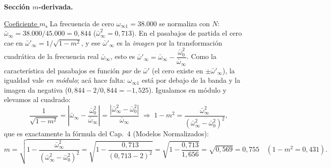 \documentclass[class=article, crop=false, oneside]{standalone}
\begin{document}
\begin{figure}[H]
    \centering
    
\end{figure}

\noindent\textbf{Sección $m$-derivada.}

\noindent\underline{Coeficiente $m$.} La frecuencia de cero $\omega_{\infty 1} = 38.000$
se normaliza con $N$: $\bar\omega_\infty = 38.000/45.000 = 0{,}844$
($\bar\omega_\infty^2 = 0{,}713$). En el pasabajos de partida el cero cae en
$\bar\omega'_\infty = 1/\sqrt{1-m^2}$, y ese $\bar\omega'_\infty$ es la \emph{imagen}
por la transformación cuadrática de la frecuencia real $\bar\omega_\infty$, esto es
$\bar\omega'_\infty = \bar\omega_\infty - \dfrac{\bar\omega_0^2}{\bar\omega_\infty}$.
Como la característica del pasabajos es función \emph{par} de $\bar\omega'$ (el cero
existe en $\pm\bar\omega'_\infty$), la igualdad vale \emph{en módulo}; acá hace falta:
$\omega_{\infty 1}$ está por debajo de la banda y la imagen da negativa
($0{,}844 - 2/0{,}844 = -1{,}525$). Igualamos en módulo y elevamos al cuadrado:
\[
    \frac{1}{\sqrt{1-m^2}} = \left|\bar\omega_\infty - \frac{\bar\omega_0^2}{\bar\omega_\infty}\right|
    = \frac{\left|\bar\omega_\infty^2-\bar\omega_0^2\right|}{\bar\omega_\infty}
    \;\Rightarrow\;
    1-m^2 = \frac{\bar\omega_\infty^2}{\left(\bar\omega_\infty^2-\bar\omega_0^2\right)^2},
\]
que es exactamente la fórmula del Cap.~4 (Modelos Normalizados):
\[
    m = \sqrt{1-\frac{\bar\omega_\infty^2}{\left(\bar\omega_\infty^2-\bar\omega_0^2\right)^2}}
      = \sqrt{1-\frac{0{,}713}{(0{,}713-2)^2}}
      = \sqrt{1-\frac{0{,}713}{1{,}656}} = \sqrt{0{,}569} = 0{,}755 \quad (1-m^2 = 0{,}431).
\]
\end{document}

